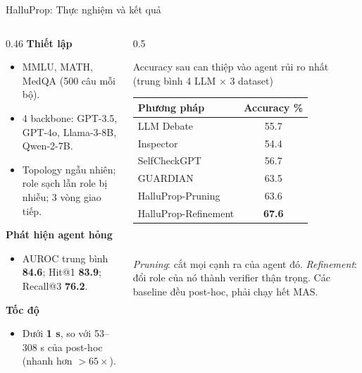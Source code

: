 \documentclass[aspectratio=169,10pt]{beamer}
\begin{document}
\begin{frame}{HalluProp: Thực nghiệm và kết quả}
  \begin{columns}[T]
    \begin{column}{0.46\textwidth}
      \textbf{Thiết lập}
      \begin{itemize}\small
        \item MMLU, MATH, MedQA (500 câu mỗi bộ).
        \item 4 backbone: GPT-3.5, GPT-4o, Llama-3-8B, Qwen-2-7B.
        \item Topology ngẫu nhiên; role sạch lẫn role bị nhiễu; 3 vòng giao tiếp.
      \end{itemize}
      \textbf{Phát hiện agent hỏng}
      \begin{itemize}\small
        \item AUROC trung bình \textbf{84.6}; Hit@1 \textbf{83.9}; Recall@3 \textbf{76.2}.
      \end{itemize}
      \textbf{Tốc độ}
      \begin{itemize}\small
        \item Dưới \textbf{1 s}, so với 53--308 s của post-hoc (nhanh hơn $>65\times$).
      \end{itemize}
    \end{column}
    \begin{column}{0.5\textwidth}
      \centering
      {\small Accuracy sau can thiệp vào agent rủi ro nhất\\ (trung bình 4 LLM $\times$ 3 dataset)\par}
      \vspace{4pt}
      \small
      \begin{tabular}{@{}l c@{}}
        \toprule
        Phương pháp & Accuracy \% \\
        \midrule
        LLM Debate   & 55.7 \\
        Inspector    & 54.4 \\
        SelfCheckGPT & 56.7 \\
        GUARDIAN     & 63.5 \\
        \midrule
        HalluProp-Pruning     & 63.6 \\
        HalluProp-Refinement  & \textbf{67.6} \\
        \bottomrule
      \end{tabular}\\[4pt]
      \raggedright\footnotesize
      \emph{Pruning}: cắt mọi cạnh ra của agent đó.
      \emph{Refinement}: đổi role của nó thành verifier thận trọng.
      Các baseline đều post-hoc, phải chạy hết MAS.
    \end{column}
  \end{columns}
\end{frame}
\end{document}
